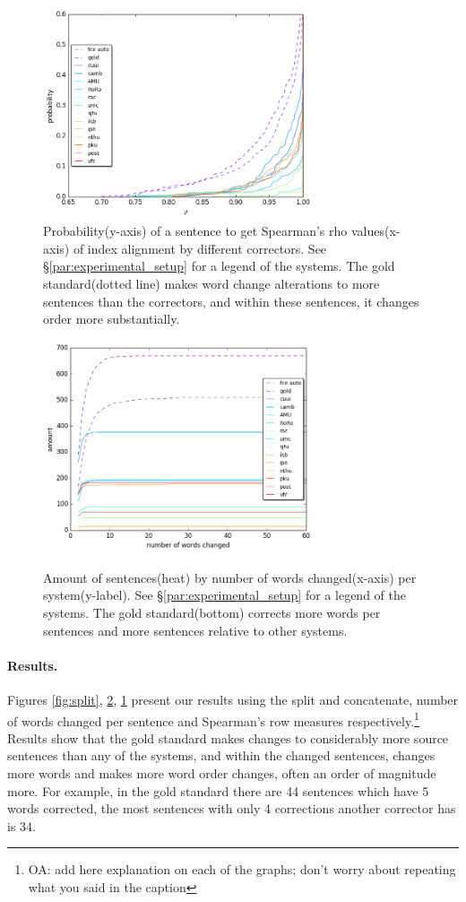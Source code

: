 \documentclass[english]{article}
\newcommand{\oa}[1]{\footnote{\color{red}OA: #1}}
\begin{document}
\begin{figure}
	\includegraphics[width = 8cm]{spearman_ecdf}
		\caption{Probability(y-axis) of a sentence to get Spearman's rho values(x-axis) of index alignment by different correctors. See \S\ref{par:experimental_setup} for a legend
		of the systems.
          The gold standard(dotted line) makes word change alterations to more sentences than the correctors,
          and within these sentences, it changes order more substantially.}
	\label{fig:rho}
\end{figure}

\begin{figure}
	\includegraphics[width = 8cm]{words_differences}
	\label{fig:words_changed}
        \caption{Amount of sentences(heat) by number of words 
        	changed(x-axis) per system(y-label). See \S\ref{par:experimental_setup} for a legend
        	of the systems. The gold standard(bottom) corrects more words per sentences and more sentences relative to other systems.}
\end{figure}

\paragraph{Results.}
Figures \ref{fig:split}, \ref{fig:words_changed}, \ref{fig:rho} present our results using the split and concatenate, number of words changed per sentence and Spearman's row measures respectively.\oa{add here explanation on each of the graphs; don't worry about repeating what you said in the caption}
Results show that the gold standard makes changes to considerably more source sentences than any of the systems, and within the changed sentences, changes more words and makes more word order changes, often an order of magnitude more. For example, in the gold standard there are 44 sentences which have 5 words corrected, the most sentences with only 4 corrections another corrector has is 34.
\end{document}
